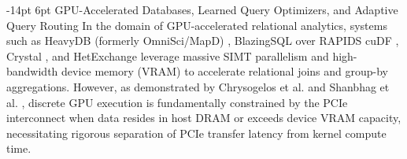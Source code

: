 \documentclass[10pt,a4paper]{article}
\makeatletter
\renewcommand\subsection{\@startsection{subsection}{2}{\z@}%
  {-14pt \@plus -3pt \@minus -1.5pt}%
  {6pt \@plus 1.5pt}%
  {\normalfont\normalsize\bfseries}}
\makeatother
\begin{document}
\subsection{GPU-Accelerated Databases, Learned Query Optimizers, and Adaptive Query Routing}
In the domain of GPU-accelerated relational analytics, systems such as HeavyDB (formerly OmniSci/MapD) \cite{root2019mapd}, BlazingSQL over RAPIDS cuDF \cite{kim2022blazingsql}, Crystal \cite{shanbhag2020crystal}, and HetExchange \cite{chrysogelos2019hetexchange} leverage massive SIMT parallelism and high-bandwidth device memory (VRAM) to accelerate relational joins and group-by aggregations. However, as demonstrated by Chrysogelos et al. \cite{chrysogelos2019hetexchange} and Shanbhag et al. \cite{shanbhag2020crystal}, discrete GPU execution is fundamentally constrained by the PCIe interconnect when data resides in host DRAM or exceeds device VRAM capacity, necessitating rigorous separation of PCIe transfer latency from kernel compute time.
\end{document}
